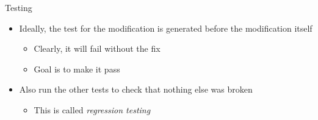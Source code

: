 \documentclass[
ps,
]{prosper}
\begin{document}
\begin{slide}{Testing}

\begin{itemize}

\item Ideally, the test for the modification is generated before the
  modification itself

  \begin{itemize}
    
  \item Clearly, it will fail without the fix

  \item Goal is to make it pass
    
  \end{itemize}

\item Also run the other tests to check that nothing else was broken

  \begin{itemize}
    
  \item This is called \emph{regression testing}
    
  \end{itemize}
  
\end{itemize}
  
\end{slide}
\end{document}
